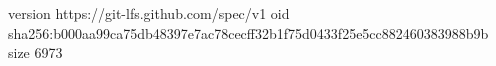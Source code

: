 version https://git-lfs.github.com/spec/v1
oid sha256:b000aa99ca75db48397e7ac78cecff32b1f75d0433f25e5cc882460383988b9b
size 6973

